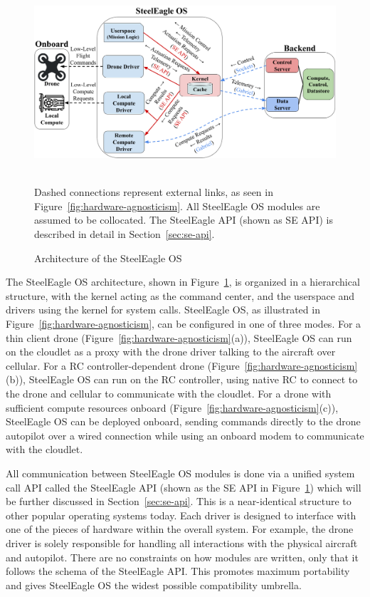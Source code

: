 \begin{figure}
    \centering
    \includegraphics[width=1.0\linewidth]{chapter7/FIGS/companion-os.png}
    \begin{captext}
    \\[0.1cm] \small Dashed connections represent external links, as seen in Figure~\ref{fig:hardware-agnosticism}. All SteelEagle OS modules are assumed to be collocated. The SteelEagle API (shown as SE API) is described in detail in Section~\ref{sec:se-api}.
    \end{captext}
    \caption{Architecture of the SteelEagle OS}
    \label{fig:companion-os}
\end{figure}

The SteelEagle OS architecture, shown in Figure~\ref{fig:companion-os}, is organized in a hierarchical structure, with the kernel acting as the command center, and the userspace and drivers using the kernel for system calls. SteelEagle OS, as illustrated in Figure~\ref{fig:hardware-agnosticism}, can be configured in one of three modes. For a thin client drone (Figure~\ref{fig:hardware-agnosticism}(a)), SteelEagle OS can run on the cloudlet as a proxy with the drone driver talking to the aircraft over cellular. For a RC controller-dependent drone (Figure~\ref{fig:hardware-agnosticism}(b)), SteelEagle OS can run on the RC controller, using native RC to connect to the drone and cellular to communicate with the cloudlet. For a drone with sufficient compute resources onboard (Figure~\ref{fig:hardware-agnosticism}(c)), SteelEagle OS can be deployed onboard, sending commands directly to the drone autopilot over a wired connection while using an onboard modem to communicate with the cloudlet.

All communication between SteelEagle OS modules is done via a unified system call API called the SteelEagle API (shown as the SE API in Figure~\ref{fig:companion-os}) which will be further discussed in Section~\ref{sec:se-api}. This is a near-identical structure to other popular operating systems today. Each driver is designed to interface with one of the pieces of hardware within the overall system. For example, the drone driver is solely responsible for handling all interactions with the physical aircraft and autopilot. There are no constraints on how modules are written, only that it follows the schema of the SteelEagle API. This promotes maximum portability and gives SteelEagle OS the widest possible compatibility umbrella.


